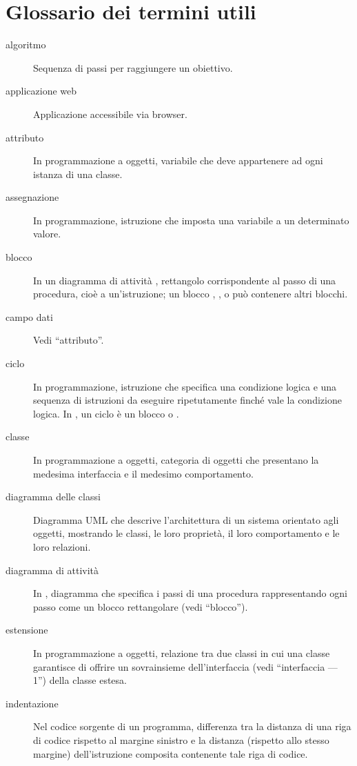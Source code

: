 \appendix


\section{Glossario dei termini utili} \label{app:gloss}

\begin{description}
	\item[algoritmo] Sequenza di passi per raggiungere un obiettivo.
	\item[applicazione web] Applicazione accessibile via browser.
	\item[attributo] In programmazione a oggetti, variabile che deve appartenere ad ogni istanza di una classe.
	\item[assegnazione] In programmazione, istruzione che imposta una variabile a un determinato valore.
	\item[blocco] In un diagramma di attività \proj, rettangolo corrispondente al passo di una procedura, cioè a un'istruzione; un blocco , ,  o  può contenere altri blocchi.
	\item[campo dati] Vedi “attributo”.
	\item[ciclo] In programmazione, istruzione che specifica una condizione logica e una sequenza di istruzioni da eseguire ripetutamente finché vale la condizione logica. In \proj, un ciclo è un blocco  o .
	\item[classe] In programmazione a oggetti, categoria di oggetti che presentano la medesima interfaccia e il medesimo comportamento.
	\item[diagramma delle classi] Diagramma UML che descrive l'architettura di un sistema orientato agli oggetti, mostrando le classi, le loro proprietà, il loro comportamento e le loro relazioni.
	\item[diagramma di attività] In \proj, diagramma che specifica i passi di una procedura rappresentando ogni passo come un blocco rettangolare (vedi “blocco”).
	\item[estensione] In programmazione a oggetti, relazione tra due classi in cui una classe garantisce di offrire un sovrainsieme dell'interfaccia (vedi “interfaccia --- 1”) della classe estesa.
	\item[indentazione] Nel codice sorgente di un programma, differenza tra la distanza di una riga di codice rispetto al margine sinistro e la distanza (rispetto allo stesso margine) dell'istruzione composita contenente tale riga di codice.

\end{description}

